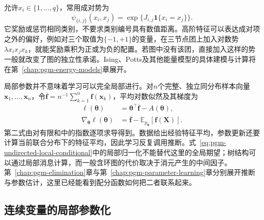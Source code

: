 允许$x_i\in\{1,\ldots,q\}$，常用成对势为
\[
  \psi_{\{i,j\}}(x_i,x_j)
  =\exp\{J_{i,j}\mathbf{1}\{x_i=x_j\}\}.
\]
它奖励或惩罚相同类别，不要求类别编号具有数值距离。高阶特征可以表达成对项之外的偏好，例如对三个取值为$\{-1,+1\}$的变量，在三节点团上加入对数势$\lambda x_i x_j x_k$，就能奖励乘积为正或为负的配置。若图中没有该团，直接加入这样的势一般就改变了图的独立性承诺。Ising、Potts及其他能量模型的具体建模与计算将在第~\ref{chap:pgm-energy-models}章展开。

局部参数并不意味着学习可以完全局部进行。对$n$个完整、独立同分布样本向量$\bm{x}_1,\ldots,\bm{x}_n$，令$\overline{\bm{f}}=n^{-1}\sum_{k=1}^n\bm{f}(\bm{x}_k)$，平均对数似然及其梯度为
\begin{equation}
  \begin{aligned}
    \ell(\bm{\theta})
      &=\bm{\theta}^{\top}\overline{\bm{f}}-A(\bm{\theta}),\\
    \nabla_{\bm{\theta}}\ell(\bm{\theta})
      &=\overline{\bm{f}}
        -\mathbb{E}_{p_{\bm{\theta}}}[\bm{f}(\bm{X})].
  \end{aligned}
  \label{eq:pgm-undirected-learning-gradient}
\end{equation}
第二式由对有限和中的指数逐项求导得到。数据给出经验特征平均，参数更新还要计算当前联合分布下的特征平均，因此学习反复调用推断。式~\eqref{eq:pgm-undirected-local-conditional}中的局部归一化不能替代这里的全局期望；树结构可以通过局部消息计算，而一般含环图的代价取决于消元产生的中间因子。第~\ref{chap:pgm-elimination}章与第~\ref{chap:pgm-parameter-learning}章分别展开推断与参数估计，这里已经能看到配分函数如何把二者联系起来。

\subsection{连续变量的局部参数化}
\label{sec:pgm-undirected-continuous-parameterization}

